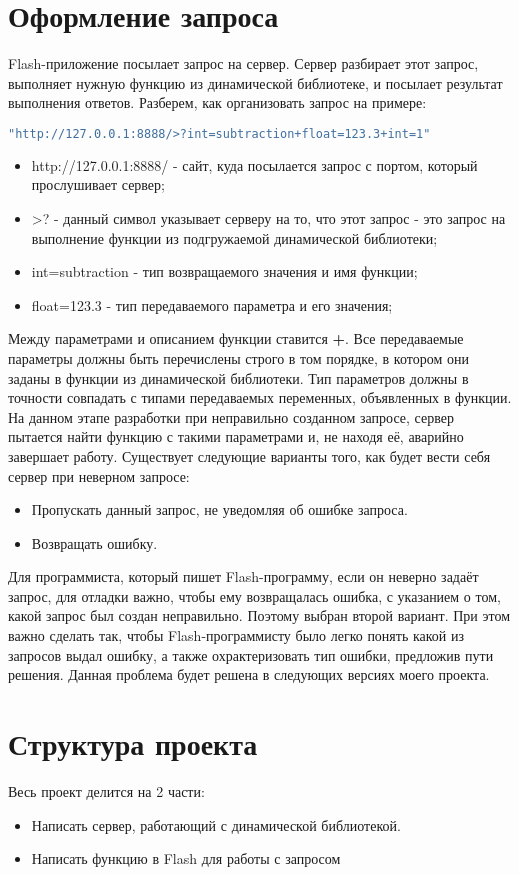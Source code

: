 \section{Оформление запроса}
Flash-приложение посылает запрос на сервер. Сервер разбирает этот запрос, выполняет нужную функцию из динамической библиотеке, и посылает результат выполнения ответов. Разберем, как организовать запрос на примере:
\begin{lstlisting}[numbers=none, language=bash]
"http://127.0.0.1:8888/>?int=subtraction+float=123.3+int=1"
\end{lstlisting}
\begin{itemize}
   \item http://127.0.0.1:8888/ - сайт, куда посылается запрос с портом, который прослушивает сервер;
   \item >? - данный символ указывает серверу на то, что этот запрос - это запрос на выполнение функции из подгружаемой динамической библиотеки;
  \item int=subtraction - тип возвращаемого значения и имя функции;
  \item float=123.3 - тип передаваемого параметра и его значения;
\end{itemize}
Между параметрами и описанием функции ставится \textbf{+}. Все передаваемые параметры должны быть перечислены строго в том порядке, в котором они заданы в функции из динамической библиотеки. Тип параметров должны в точности совпадать с типами передаваемых переменных, объявленных в функции.
На данном этапе разработки при неправильно созданном запросе, сервер пытается найти функцию с такими параметрами и, не находя её, аварийно завершает работу.
Существует следующие варианты того, как будет вести себя сервер при неверном запросе:
\begin{itemize}
  \item Пропускать данный запрос, не уведомляя об ошибке запроса.
  \item Возвращать ошибку.
\end{itemize}
Для программиста, который пишет Flash-программу, если он неверно задаёт запрос, для отладки важно, чтобы ему возвращалась ошибка, с указанием о том, какой запрос был создан неправильно. Поэтому выбран второй вариант. При этом важно сделать так, чтобы Flash-программисту было легко понять какой из запросов выдал ошибку, а также охрактеризовать тип ошибки, предложив пути решения. Данная проблема будет решена в следующих версиях моего проекта.
\section{Структура проекта}\label{projectStructure}
Весь проект делится на 2 части:
\begin{itemize}
  \item  Написать сервер, работающий с динамической библиотекой.
  \item Написать функцию в Flash для работы с запросом
\end{itemize}
